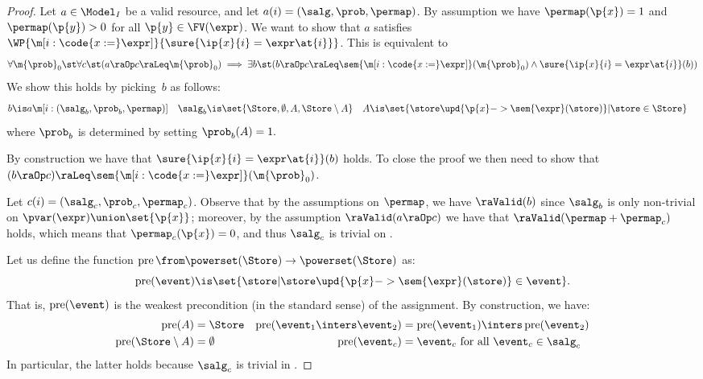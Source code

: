 \begin{proof}
  \newcommand{\specialevent}{A}
  Let $a \in \Model_I$ be a valid resource,
  and let $a(i) = (\salg, \prob, \permap)$.
  By assumption we have
  $\permap(\p{x}) = 1$ and
  $\permap(\p{y}) > 0$ for all $ \p{y} \in \FV(\expr)$.
  We want to show that $a$ satisfies
  $\WP {\m[i: \code{x:=}\expr]} {\sure{\ip{x}{i} = \expr\at{i}}}$.
This is equivalent to
\[
    \forall \m{\prob}_0 \st
      \forall c\st
      (a\raOp c \raLeq  \m{\prob}_0)
      \implies
        \exists b\st (
          b\raOp c \raLeq  \sem{\m[i: \code{x:=}\expr]}(\m{\prob}_0) \land
          \sure{\ip{x}{i} = \expr\at{i}}(b)
        )
  \]
  We show this holds by picking~$b$ as follows:
  \begin{align*}
    b &\is a\m[i: {(\salg_b, \prob_b, \permap)}]
    &
    \salg_b &\is \set{
      \Store,\emptyset,\specialevent,\Store\setminus\specialevent
    }
    &
    \specialevent &\is \set{
      \store\upd{\p{x}->\sem{\expr}(\store)} | \store \in \Store
}
  \end{align*}
  where $\prob_b$ is determined by setting $ \prob_b(\specialevent)=1. $

  By construction we have that $\sure{\ip{x}{i} = \expr\at{i}}(b)$ holds.
  To close the proof we then need to show that
$(b \raOp c) \raLeq \sem{\m[i: \code{x:=}\expr]}(\m{\prob}_0)$.

  Let $c(i) = (\salg_c,\prob_c,\permap_c)$.
  Observe that by the assumptions on $\permap$,
  we have $\raValid(b)$ since $\salg_b$ is
  only non-trivial on $\pvar(\expr)\union\set{\p{x}}$;
  moreover, by the assumption $\raValid(a \raOp c)$
  we have that $\raValid(\permap + \permap_c)$ holds,
  which means that $\permap_c(\p{x})=0$,
  and thus $\salg_c$ is trivial on .


  \newcommand{\Pre}{\operatorname{pre}}
Let us define the function
  $
    \Pre \from \powerset(\Store) \to \powerset(\Store)
  $
  as:
  \[
    \Pre(\event) \is
      \set{ \store
          | \store\upd{\p{x}->\sem{\expr}(\store)} \in \event
        }.
  \]
  That is, $\Pre(\event)$ is the weakest precondition (in the standard sense)
  of the assignment.
  By construction, we have:
  \begin{align*}
    \Pre(\specialevent) &= \Store
    &
    \Pre(\event_1 \inters \event_2) &=
      \Pre(\event_1) \inters \Pre(\event_2)
    \\
    \Pre(\Store \setminus \specialevent) &= \emptyset
    &
    \Pre(\event_c) &= \event_c
      \text{ for all } \event_c \in \salg_c
  \end{align*}
  In particular, the latter holds because $\salg_c$ is trivial in .


\end{proof}
